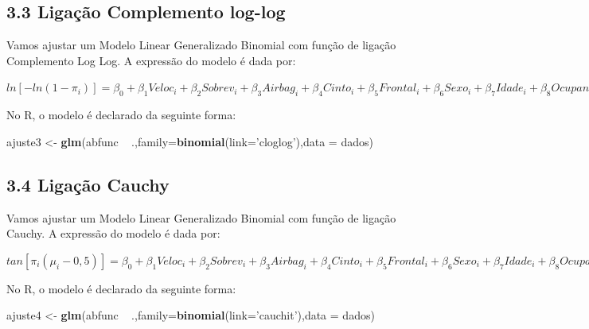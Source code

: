 \documentclass[]{article}
\newenvironment{Shaded}{\begin{snugshade}}{\end{snugshade}}
\newcommand{\KeywordTok}[1]{\textcolor[rgb]{0.13,0.29,0.53}{\textbf{{#1}}}}
\newcommand{\DataTypeTok}[1]{\textcolor[rgb]{0.13,0.29,0.53}{{#1}}}
\newcommand{\StringTok}[1]{\textcolor[rgb]{0.31,0.60,0.02}{{#1}}}
\newcommand{\NormalTok}[1]{{#1}}
\begin{document}
\subsection{\texorpdfstring{\textbf{3.3 Ligação Complemento
log-log}}{3.3 Ligação Complemento log-log}}\label{ligacao-complemento-log-log}

Vamos ajustar um Modelo Linear Generalizado Binomial com função de
ligação Complemento Log Log. A expressão do modelo é dada por:

\(ln[-ln(1-\pi_i)] = \beta_0 + \beta_1 Veloc_i + \beta_2 Sobrev_i + \beta_3 Airbag_i + \beta_4 Cinto_i + \beta_5 Frontal_i + \beta_6 Sexo_i + \beta_7 Idade_i + \beta_8 Ocupantes_i + \beta_9 Grav_i\)

No R, o modelo é declarado da seguinte forma:

\begin{Shaded}
\begin{Highlighting}[]
\NormalTok{ajuste3 <-}\StringTok{ }\KeywordTok{glm}\NormalTok{(abfunc ~}\StringTok{ }\NormalTok{.,}\DataTypeTok{family=}\KeywordTok{binomial}\NormalTok{(}\DataTypeTok{link=}\StringTok{'cloglog'}\NormalTok{),}\DataTypeTok{data =} \NormalTok{dados)}
\end{Highlighting}
\end{Shaded}

\subsection{\texorpdfstring{\textbf{3.4 Ligação
Cauchy}}{3.4 Ligação Cauchy}}\label{ligacao-cauchy}

Vamos ajustar um Modelo Linear Generalizado Binomial com função de
ligação Cauchy. A expressão do modelo é dada por:

\(tan[\pi_i(\mu_i- 0,5)] = \beta_0 + \beta_1 Veloc_i + \beta_2 Sobrev_i + \beta_3 Airbag_i + \beta_4 Cinto_i + \beta_5 Frontal_i + \beta_6 Sexo_i + \beta_7 Idade_i + \beta_8 Ocupantes_i + \beta_9 Grav_i\)

No R, o modelo é declarado da seguinte forma:

\begin{Shaded}
\begin{Highlighting}[]
\NormalTok{ajuste4 <-}\StringTok{ }\KeywordTok{glm}\NormalTok{(abfunc ~}\StringTok{ }\NormalTok{.,}\DataTypeTok{family=}\KeywordTok{binomial}\NormalTok{(}\DataTypeTok{link=}\StringTok{'cauchit'}\NormalTok{),}\DataTypeTok{data =} \NormalTok{dados)}
\end{Highlighting}
\end{Shaded}
\end{document}
